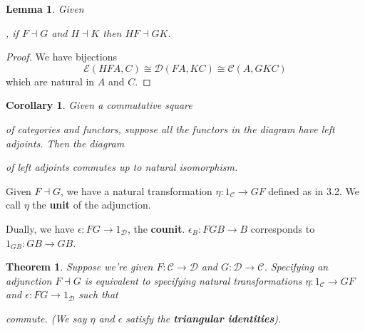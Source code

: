 \documentclass[a4paper]{article}
\newtheorem{lemma}[definition]{Lemma}
\newtheorem{corollary}[definition]{Corollary}
\newtheorem{theorem}[definition]{Theorem}
\numberwithin{definition}{section}
\begin{document}
\begin{lemma}
	Given
	,
	if $F \dashv G$ and $H \dashv K$ then $HF \dashv GK$.
\end{lemma}
\begin{proof}
	We have bijections
	$$\mathcal{E}(HFA, C) \cong \mathcal{D}(FA, KC) \cong \mathcal{C}(A, GKC)$$
	which are natural in $A$ and $C$.
\end{proof}

\begin{corollary}
	Given a commutative square
	of categories and functors,
	suppose all the functors in the diagram have left adjoints.
	Then the diagram
	of left adjoints commutes up to natural isomorphism.
\end{corollary}

Given $F \dashv G$,
we have a natural transformation $\eta: 1_\mathcal{C} \to GF$
defined as in 3.2. We call $\eta$ the \textbf{unit} of the adjunction.

Dually, we have $\epsilon: FG \to 1_\mathcal{D}$, the \textbf{counit}.
$\epsilon_B: FGB \to B$ corresponds to $1_{GB}: GB \to GB$.

\begin{theorem}
	Suppose we're given $F: \mathcal{C} \to \mathcal{D}$ and $G: \mathcal{D} \to \mathcal{C}$.
	Specifying an adjunction $F \dashv G$ is equivalent to specifying natural transformations
	$\eta: 1_\mathcal{C} \to GF$ and $\epsilon: FG \to 1_\mathcal{D}$ such that
	\begin{center}
	\end{center}
	commute.
	(We say $\eta$ and $\epsilon$ satisfy the \textbf{triangular identities}).
\end{theorem}
\end{document}
